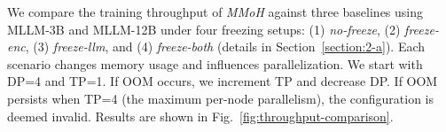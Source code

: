 \documentclass[conference]{IEEEtran}
\begin{document}
We compare the training throughput of \textit{MMoH} against three baselines using MLLM-3B and MLLM-12B under four freezing setups: (1) \textit{no-freeze}, (2) \textit{freeze-enc}, (3) \textit{freeze-llm}, and (4) \textit{freeze-both} (details in Section~\ref{section:2-a}). Each scenario changes memory usage and influences parallelization.
We start with DP=4 and TP=1. If OOM occurs, we increment TP and decrease DP. If OOM persists when TP=4 (the maximum per-node parallelism), the configuration is deemed invalid. Results are shown in Fig.~\ref{fig:throughput-comparison}.

\end{document}
